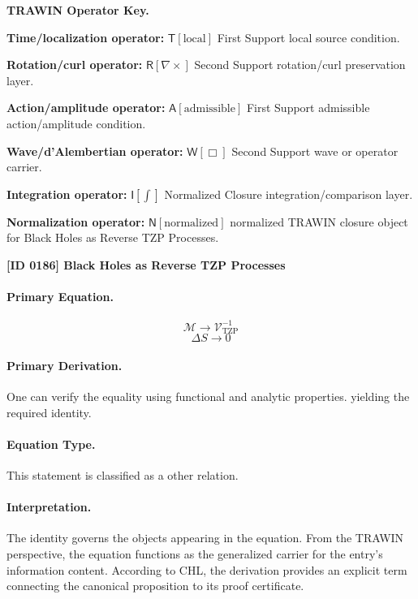 \par\vspace{0.45\baselineskip}
\noindent\begin{minipage}[t]{\linewidth}
\begingroup
\small
\raggedright
\textbf{TRAWIN Operator Key.}\par
\noindent\textbf{Time/localization operator:} $\mathsf{T}\!\left[\mathrm{local}\right]$ First Support local source condition.\par
\noindent\textbf{Rotation/curl operator:} $\mathsf{R}\!\left[\nabla\times\right]$ Second Support rotation/curl preservation layer.\par
\noindent\textbf{Action/amplitude operator:} $\mathsf{A}\!\left[\mathrm{admissible}\right]$ First Support admissible action/amplitude condition.\par
\noindent\textbf{Wave/d'Alembertian operator:} $\mathsf{W}\!\left[\Box\right]$ Second Support wave or operator carrier.\par
\noindent\textbf{Integration operator:} $\mathsf{I}\!\left[\int\right]$ Normalized Closure integration/comparison layer.\par
\noindent\textbf{Normalization operator:} $\mathsf{N}\!\left[\mathrm{normalized}\right]$ normalized TRAWIN closure object for Black Holes as Reverse TZP Processes.\par
\endgroup
\end{minipage}

\clearpage
\noindent\textbf{[ID 0186] Black Holes as Reverse TZP Processes}\par
\vspace{0.35em}
\paragraph{Primary Equation.}
\[
\mathcal{M} \rightarrow \mathcal{V}_{\mathrm{TZP}}^{-1}
\]
\[
\Delta S \rightarrow 0
\]

\paragraph{Primary Derivation.}
One can verify the equality using functional and analytic properties. yielding the required identity.
\paragraph{Equation Type.}
This statement is classified as a other relation.

\paragraph{Interpretation.}
The identity governs the objects appearing in the equation. From the TRAWIN perspective, the equation functions as the generalized carrier for the entry’s information content. According to CHL, the derivation provides an explicit term connecting the canonical proposition to its proof certificate.

